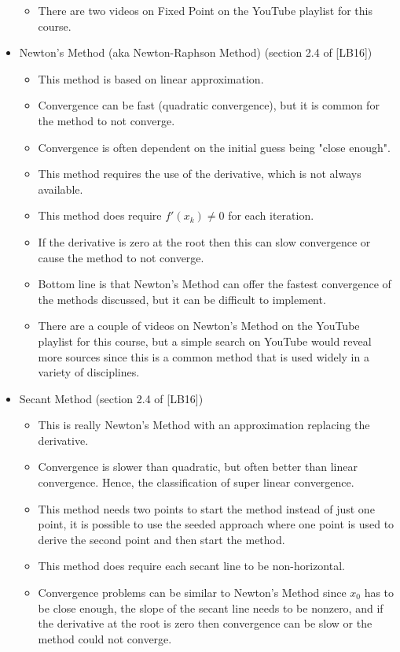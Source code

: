 \documentclass[twoside]{article}
\renewcommand{\cite}[1]{[#1]}
\def\ds{\displaystyle}
\begin{document}
\begin{itemize}
\begin{itemize}
        \item There are two videos on Fixed Point on the YouTube playlist for this course.  
    \end{itemize}
    \item Newton's Method (aka Newton-Raphson Method) (section 2.4 of \cite{LB16})
    \begin{itemize}
        \item This method is based on linear approximation.
        \item Convergence can be fast (quadratic convergence), but it is common for the method to not converge.
        \item Convergence is often dependent on the initial guess being "close enough".
        \item This method requires the use of the derivative, which is not always available. 
        \item This method does require $\ds f'(x_k)\neq 0$ for each iteration. 
        \item If the derivative is zero at the root then this can slow convergence or cause the method to not converge. 
        \item Bottom line is that Newton's Method can offer the fastest convergence of the methods discussed, but it can be difficult to implement. 
        \item There are a couple of videos on Newton's Method on the YouTube playlist for this course, but a simple search on YouTube would reveal more sources since this is a common method that is used widely in a variety of disciplines. 
    \end{itemize}
    \item Secant Method (section 2.4 of \cite{LB16})
    \begin{itemize}
        \item This is really Newton's Method with an approximation replacing the derivative.
        \item Convergence is slower than quadratic, but often better than linear convergence. Hence, the classification of super linear convergence. 
        \item This method needs two points to start the method instead of just one point, it is possible to use the seeded approach where one point is used to derive the second point and then start the method. 
        \item This method does require each secant line to be non-horizontal.
        \item Convergence problems can be similar to Newton's Method since $\ds x_0$ has to be close enough, the slope of the secant line needs to be nonzero, and if the derivative at the root is zero then convergence can be slow or the method could not converge. 
    \end{itemize}
\end{itemize}
\end{document}
